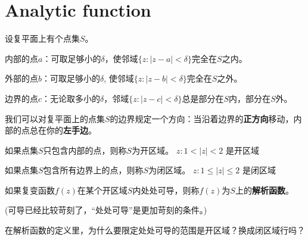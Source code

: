 \documentclass[CJK]{beamer}
\begin{document}
\section{Analytic function}


\begin{frame}
  \bch
  设复平面上有个点集$S$。
  
  \emini
  \bitem
  \item{
  内部的点$a$：可取足够小的$\delta$，使邻域$\{z: |z-a|<\delta\}$完全在$S$之内。}
  \item{外部的点$b$：可取足够小的$\delta$, 使邻域$\{z: |z-b|<\delta\}$完全在$S$之外。}
  \item{边界的点$c$：无论取多小的$\delta$，邻域$\{z: |z-c|<\delta\}$总是部分在$S$内，部分在$S$外。}
    \eitem
  \emini
  \ech
\end{frame}


\begin{frame}
  \bch
  我们可以对复平面上的点集$S$的边界规定一个方向：当沿着边界的{\bf 正方向}移动，{内部的点}总在你的{\bf 左手边}。
  \ech
\end{frame}

\begin{frame}
  \bch
  \bitem
  \item
 { 如果点集$S$只包含内部的点，则称$S$为开区域。
  \bex
  ${z: 1<|z|<2}$
  是开区域
  \eex
 }
 \item{
  如果点集$S$包含所有边界上的点，则称$S$为闭区域。
  \bex
  ${z: 1\le |z|\le 2}$
  是闭区域
  \eex
 }
   \eitem
  \ech
\end{frame}

\begin{frame}
  \bch
  如果复变函数$f(z)$在某个开区域$S$内处处可导，则称$f(z)$为$S$上的{\bf 解析函数}。

  \skiplines
  
  (可导已经比较苛刻了，“处处可导”是更加苛刻的条件。)
  \ech
\end{frame}


\begin{frame}
  \bch
  
  在解析函数的定义里，为什么要限定处处可导的范围是开区域？换成闭区域行吗？
  \ech
\end{frame}
\end{document}
